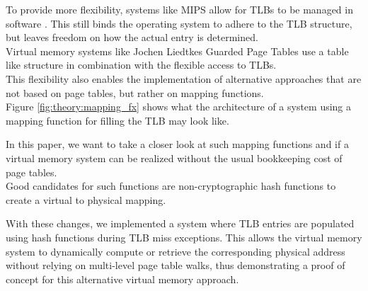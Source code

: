 To provide more flexibility, systems like MIPS allow for TLBs to be managed in software \cite{heiserAnatomyHighPerformanceMicrokernel}.
This still binds the operating system to adhere to the TLB structure, but leaves freedom on how the actual
entry is determined.\\

Virtual memory systems like Jochen Liedtkes Guarded Page Tables \cite{liedtkeGPT} use a table like structure
in combination with the flexible access to TLBs.\\

This flexibility also enables the implementation of alternative approaches that are not based on page tables,
but rather on mapping functions.\\

Figure \ref{fig:theory:mapping_fx} shows what the architecture of a system using a mapping function for
filling the TLB may look like.

In this paper, we want to take a closer look at such mapping functions and if a virtual memory system
can be realized without the usual bookkeeping cost of page tables.\\
Good candidates for such functions are non-cryptographic hash functions
to create a virtual to physical mapping.




%
With these changes, we implemented a system where TLB entries are populated using hash functions during TLB miss exceptions. This allows the virtual memory system to dynamically compute or retrieve the corresponding physical address without relying on multi-level page table walks, thus demonstrating a proof of concept for this alternative virtual memory approach.

